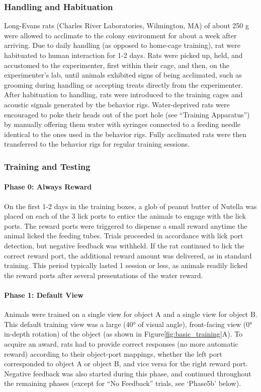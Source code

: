 \subsubsection{Handling and Habituation}
Long-Evans rats (Charles River Laboratories, Wilmington, MA) of about 250 g were allowed to acclimate to the colony environment for about a week after arriving. Due to daily handling (as opposed to home-cage training), rat were habituated to human interaction for 1-2 days. Rats were picked up, held, and accustomed to the experimenter, first within their cage, and then, on the experimenter's lab, until animals exhibited signs of being acclimated, such as grooming during handling or accepting treats directly from the experimenter. After habituation to handling, rats were introduced to the training cages and acoustic signals generated by the behavior rigs. Water-deprived rats were encouraged to poke their heads out of the port hole (see ``Training Apparatus'') by manually offering them water with syringes connected to a feeding needle identical to the ones used in the behavior rigs. Fully acclimated rats were then transferred to the behavior rigs for regular training sessions.

\subsubsection{Training and Testing}
\paragraph{Phase 0: Always Reward}
On the first 1-2 days in the training boxes, a glob of peanut butter of Nutella was placed on each of the 3 lick ports to entice the animals to engage with the lick ports. The reward ports were triggered to dispense a small reward anytime the animal licked the feeding tubes. Trials proceeded in accordance with lick port detection, but negative feedback was withheld. If the rat continued to lick the correct reward port, the additional reward amount was delivered, as in standard training. This period typically lasted 1 session or less, as animals readily licked the reward ports after several presentations of the water reward.

\paragraph{Phase 1: Default View}
Animals were trained on a single view for object A and a single view for object B. This default training view was a large (\ang{40} of visual angle), front-facing view (\ang{0} in-depth rotation) of the object (as shown in Figure\ref{fig:basic_training}A). To acquire an award, rats had to provide correct responses (no more automatic reward) according to their object-port mappings, whether the left port corresponded to object A or object B, and vice versa for the right reward port. Negative feedback was also started during this phase, and continued throughout the remaining phases (except for ``No Feedback'' trials, see `Phase5b' below). 

